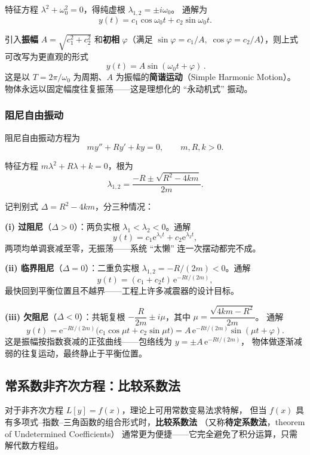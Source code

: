 \documentclass[lang=cn,11pt]{elegantbook}
\begin{document}
\begin{solution}
特征方程 $\lambda^2+\omega_0^2=0$，得纯虚根 $\lambda_{1,2}=\pm i\omega_0$。
通解为
\[
y(t)=c_1\cos\omega_0 t+c_2\sin\omega_0 t.
\]

引入\textbf{振幅} $A=\sqrt{c_1^2+c_2^2}$ 和\textbf{初相} $\varphi$（满足
$\sin\varphi=c_1/A,\;\cos\varphi=c_2/A$），则上式可改写为更直观的形式
\[
\boxed{\,y(t)=A\sin(\omega_0 t+\varphi)\,}. \tag{†}
\]
这是以 $T=2\pi/\omega_0$ 为周期、$A$ 为振幅的\textbf{简谐运动}（Simple Harmonic Motion）。
物体永远以固定幅度往复振荡——这是理想化的 ``永动机式'' 振动。
\end{solution}


\subsubsection*{阻尼自由振动}

\begin{exercise}[阻尼振动的三种模式] \label{ex:ode-damped-vib}
阻尼自由振动方程为
\[
my''+Ry'+ky=0,\qquad m,R,k>0.
\]
\end{exercise}

\begin{solution}
特征方程 $m\lambda^2+R\lambda+k=0$，根为
\[
\lambda_{1,2}=\frac{-R\pm\sqrt{R^2-4km}}{2m}.
\]

记判别式 $\Delta=R^2-4km$，分三种情况：

\textbf{(i) 过阻尼}（$\Delta>0$）：两负实根 $\lambda_1<\lambda_2<0$。通解
\[
y(t)=c_1\mathrm{e}^{\lambda_1t}+c_2\mathrm{e}^{\lambda_2t},
\]
两项均单调衰减至零，无振荡——系统 ``太懒'' 连一次摆动都完不成。

\textbf{(ii) 临界阻尼}（$\Delta=0$）：二重负实根 $\lambda_{1,2}=-R/(2m)<0$。通解
\[
y(t)=(c_1+c_2t)\,\mathrm{e}^{-Rt/(2m)},
\]
最快回到平衡位置且不越界——工程上许多减震器的设计目标。

\textbf{(iii) 欠阻尼}（$\Delta<0$）：共轭复根
$-\dfrac{R}{2m}\pm i\mu$，其中 $\mu=\dfrac{\sqrt{4km-R^2}}{2m}$。
通解
\[
y(t)=\mathrm{e}^{-Rt/(2m)}\bigl(c_1\cos\mu t+c_2\sin\mu t\bigr)
=A\,\mathrm{e}^{-Rt/(2m)}\sin(\mu t+\varphi).
\]
这是振幅按指数衰减的正弦曲线——包络线为 $y=\pm A\,\mathrm{e}^{-Rt/(2m)}$，
物体做逐渐减弱的往复运动，最终静止于平衡位置。
\end{solution}


\subsection{常系数非齐次方程：比较系数法}

对于非齐次方程 $L[y]=f(x)$，理论上可用常数变易法求特解，
但当 $f(x)$ 具有多项式–指数–三角函数的组合形式时，\textbf{比较系数法}
（又称\textbf{待定系数法}，theorem of Undetermined Coefficients）
通常更为便捷——它完全避免了积分运算，只需解代数方程组。
\end{document}
